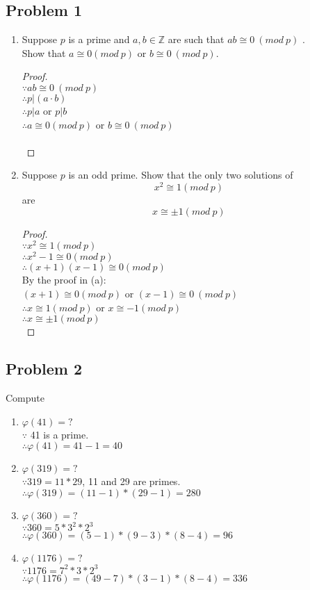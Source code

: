 \documentclass[paper=a4, fontsize=11pt]{scrartcl} %
\numberwithin{equation}{section} %
\numberwithin{figure}{section} %
\newcommand{\problem}[1]{\subsection *{Problem #1}}
\newcommand{\pnl}{$ $\newline\\}
\newcommand{\Z}{\mathbb{Z}}
\begin{document}
\pagebreak
\problem 1 
\renewcommand{\labelenumi}{(\alph{enumi})}
\begin{enumerate}
\item Suppose $p$ is a prime and $a, b \in \Z$ are such that $ab \cong 0\ (mod\ p)$ .\\
Show that $a \cong 0 (mod\ p)$ or $b \cong 0\ (mod\ p)$.\\
\begin{proof}
\pnl
$\because ab \cong 0\ (mod\ p)$\\
$\therefore p | (a\cdot b)$\\
$\therefore p | a$ or $p | b$\\
$\therefore a \cong 0 (mod\ p)$ or $b \cong 0\ (mod\ p)$\\\\
\end{proof}


\item Suppose $p$ is an odd prime. Show that the only two solutions of
$$x^2 \cong 1 (mod\ p)$$
are $$x \cong \pm 1 (mod\ p)$$
\begin{proof}
\pnl
$\because x^2 \cong 1 (mod\ p)$\\
$\therefore x^2-1 \cong 0 (mod\ p)$\\
$\therefore (x+1)(x-1) \cong 0 (mod\ p)$\\
By the proof in (a):\\
$(x+1) \cong 0 (mod\ p)$ or $(x-1) \cong 0\ (mod\ p)$\\
$\therefore x \cong 1 (mod\ p)$ or $x \cong -1 (mod\ p)$\\
$\therefore x \cong \pm 1 (mod\ p)$\\

\end{proof}
\end{enumerate}

\problem 2 Compute
\begin{enumerate}
\item $\varphi(41) = ?$\\
$\because$ 41 is a prime.\\
$\therefore \varphi(41) = 41 -1 = 40$\\
\item $\varphi(319) = ?$\\
$\because 319 = 11 * 29$, 11 and 29 are primes.\\
$\therefore \varphi(319) = (11-1) * (29-1) = 280$\\
\item $\varphi(360) = ?$\\
$\because 360 = 5 * 3^2 * 2^3$\\
$\therefore \varphi(360) = (5 - 1) * (9 - 3) * (8 - 4) = 96 $\\
\item $\varphi(1176) = ?$\\
$\because 1176 = 7^2 * 3 * 2^3$\\
$\therefore \varphi(1176) = (49 - 7) * (3 - 1) * (8 - 4) = 336 $\\
\end{enumerate}
\end{document}
